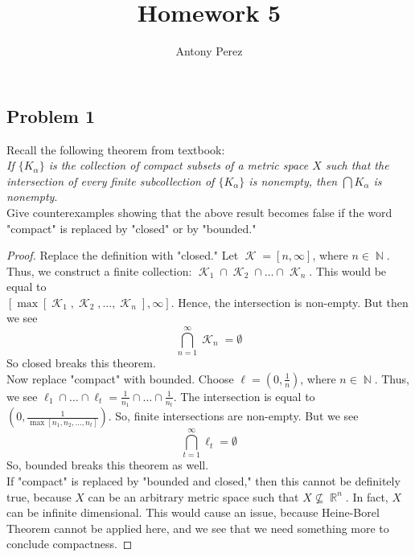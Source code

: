 \documentclass{amsart}
\title{Homework 5}
\author{Antony Perez}
\DeclareMathOperator*{\R}{\mathbb{R}}
\DeclareMathOperator{\N}{\mathbb{N}}
\DeclareMathOperator{\K}{\mathcal{K}}
\begin{document}
\maketitle

\subsection*{Problem 1} Recall the following theorem from textbook: \\ 
\textit{If $\{K_\alpha\}$ is the collection of compact subsets of a metric space $X$ such that the intersection of every finite subcollection of $\{K_\alpha\}$ is nonempty, then $\bigcap K_\alpha$ is nonempty}. \\ 
Give counterexamples showing that the above result becomes false if the word "compact" is replaced by "closed" or by "bounded."
\begin{proof}
    Replace the definition with "closed." Let $\K = [n,\infty]$, where $n \in \N$. Thus, we construct a finite collection: $\K_1 \cap \K_2 \cap \ldots \cap \K_n$. This would be equal to \\$[\max[\K_1,\K_2,\ldots,\K_n], \infty]$. Hence, the intersection is non-empty. But then we see 
    \[
    \bigcap_{n=1}^\infty \K_n = \emptyset
    \]
So closed breaks this theorem. \\
Now replace "compact" with bounded. Choose $\ell = (0,\frac{1}{n})$, where $n \in \N$. Thus, we see $\ell_1 \cap \ldots \cap \ell_t = \frac{1}{n_1}\cap\ldots \cap \frac{1}{n_t}$. The intersection is equal to $(0,\frac{1}{\max [n_1,n_2,\ldots,n_t]})$. So, finite intersections are non-empty. But we see 
\[
\bigcap_{t=1}^{\infty}\ell_t = \emptyset
\]
So, bounded breaks this theorem as well. \\
If "compact" is replaced by "bounded and closed," then this cannot be definitely true, because $X$ can be an arbitrary metric space such that $X \not \subseteq \R^n$. In fact, $X$ can be infinite dimensional. This would cause an issue, because Heine-Borel Theorem cannot be applied here, and we see that we need something more to conclude compactness. 
\end{proof}
\end{document}
